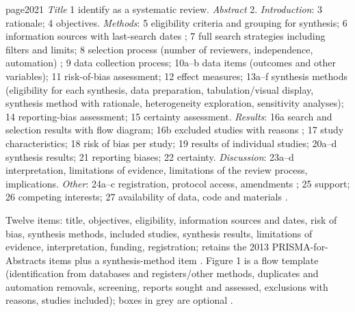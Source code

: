 \begin{papercard}{page2021}
 \emph{Title} 1 identify as a systematic review. \emph{Abstract} 2. \emph{Introduction}: 3 rationale; 4 objectives. \emph{Methods}: 5 eligibility criteria and grouping for synthesis; 6 information sources with last-search dates ; 7 full search strategies including filters and limits; 8 selection process (number of reviewers, independence, automation) ; 9 data collection process; 10a--b data items (outcomes and other variables); 11 risk-of-bias assessment; 12 effect measures; 13a--f synthesis methods (eligibility for each synthesis, data preparation, tabulation/visual display, synthesis method with rationale, heterogeneity exploration, sensitivity analyses); 14 reporting-bias assessment; 15 certainty assessment. \emph{Results}: 16a search and selection results with flow diagram; 16b excluded studies with reasons ; 17 study characteristics; 18 risk of bias per study; 19 results of individual studies; 20a--d synthesis results; 21 reporting biases; 22 certainty. \emph{Discussion}: 23a--d interpretation, limitations of evidence, limitations of the review process, implications. \emph{Other}: 24a--c registration, protocol access, amendments ; 25 support; 26 competing interests; 27 availability of data, code and materials .

 Twelve items: title, objectives, eligibility, information sources and dates, risk of bias, synthesis methods, included studies, synthesis results, limitations of evidence, interpretation, funding, registration; retains the 2013 PRISMA-for-Abstracts items plus a synthesis-method item . Figure 1 is a flow template (identification from databases and registers/other methods, duplicates and automation removals, screening, reports sought and assessed, exclusions with reasons, studies included); boxes in grey are optional .


\end{papercard}

